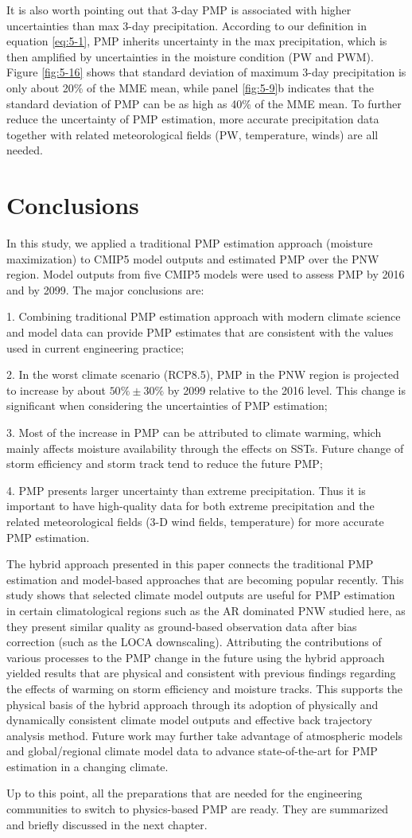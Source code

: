 It is also worth pointing out that 3-day PMP is associated with higher uncertainties than max 3-day precipitation. According to our definition in equation \ref{eq:5-1}, PMP inherits uncertainty in the max precipitation, which is then amplified by uncertainties in the moisture condition (PW and PWM). Figure \ref{fig:5-16} shows that standard deviation of maximum 3-day precipitation is only about 20\% of the MME mean, while panel \ref{fig:5-9}b indicates that the standard deviation of PMP can be as high as 40\% of the MME mean. To further reduce the uncertainty of PMP estimation, more accurate precipitation data together with related meteorological fields (PW, temperature, winds) are all needed.

\section{Conclusions}

In this study, we applied a traditional PMP estimation approach (moisture maximization) to CMIP5 model outputs and estimated PMP over the PNW region. Model outputs from five CMIP5 models were used to assess PMP by 2016 and by 2099. The major conclusions are:

1.	Combining traditional PMP estimation approach with modern climate science and model data can provide PMP estimates that are consistent with the values used in current engineering practice;

2.	In the worst climate scenario (RCP8.5), PMP in the PNW region is projected to increase by about $50\%\pm30\%$ by 2099 relative to the 2016 level. This change is significant when considering the uncertainties of PMP estimation;

3.	Most of the increase in PMP can be attributed to climate warming, which mainly affects moisture availability through the effects on SSTs. Future change of storm efficiency and storm track tend to reduce the future PMP;

4.	PMP presents larger uncertainty than extreme precipitation. Thus it is important to have high-quality data for both extreme precipitation and the related meteorological fields (3-D wind fields, temperature) for more accurate PMP estimation.

The hybrid approach presented in this paper connects the traditional PMP estimation and model-based approaches that are becoming popular recently. This study shows that selected climate model outputs are useful for PMP estimation in certain climatological regions such as the AR dominated PNW studied here, as they present similar quality as ground-based observation data after bias correction (such as the LOCA downscaling). Attributing the contributions of various processes to the PMP change in the future using the hybrid approach yielded results that are physical and consistent with previous findings regarding the effects of warming on storm efficiency and moisture tracks. This supports the physical basis of the hybrid approach through its adoption of physically and dynamically consistent climate model outputs and effective back trajectory analysis method. Future work may further take advantage of atmospheric models and global/regional climate model data to advance state-of-the-art for PMP estimation in a changing climate.

Up to this point, all the preparations that are needed for the engineering communities to switch to physics-based PMP are ready. They are summarized and briefly discussed in the next chapter.